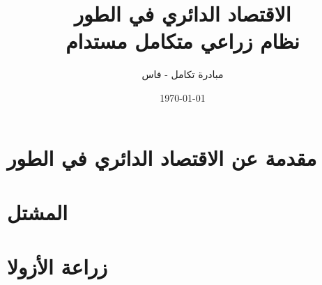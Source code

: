 \documentclass[12pt,a4paper]{report}
\title{الاقتصاد الدائري في الطور\\
\large نظام زراعي متكامل مستدام}
\author{مبادرة تكامل - فاس}
\date{\today}
\begin{document}
\maketitle
\tableofcontents

\chapter{مقدمة عن الاقتصاد الدائري في الطور}


\chapter{المشتل}









\chapter{زراعة الأزولا}








\end{document}
